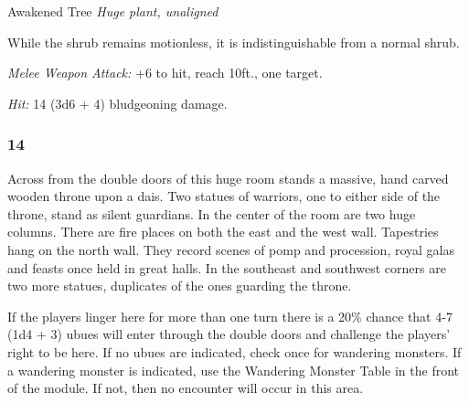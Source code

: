 \documentclass[palace_of_the_silver_princess]{subfiles}
\begin{document}
\begin{monsterbox}{Awakened Tree}
	\textit{Huge plant, unaligned}\\
	\hline
	\basics[
		armorclass = {13},
		hitpoints = {59 (7d12 + 14)},
		speed = {20~ft.}]
	\hline
	\stats[
		STR = \stat{19},
		DEX = \stat{6},
		CON = \stat{15},
		INT = \stat{10},
		WIS = \stat{10},
		CHA = \stat{7}]
	\hline
	\details[
        damagevulnerabilities = {fire},
        damageresistances = {bludgeoning, piercing},
		senses = {passive Perception 10},
		languages = {Common},
		challenge = {2 (450 XP)}]
	\hline
	\begin{monsteraction}
        While the shrub remains motionless, it is indistinguishable
        from a normal shrub.
	\end{monsteraction}

    \begin{monsteraction}[Slam]
		\textit{Melee Weapon Attack:} +6 to hit, reach 10ft., one
        target.

        \textit{Hit:} 14 (3d6 + 4) bludgeoning damage.
	\end{monsteraction}
\end{monsterbox}

\subsubsection{14}
\begin{quotebox}
    Across from the double doors of this huge room stands a massive,
    hand carved wooden throne upon a dais. Two statues of warriors, one
    to either side of the throne, stand as silent guardians. In the
    center of the room are two huge columns. There are fire places on
    both the east and the west wall. Tapestries hang on the north wall.
    They record scenes of pomp and procession, royal galas and feasts
    once held in great halls. In the southeast and southwest corners are
    two more statues, duplicates of the ones guarding the throne.
\end{quotebox}

If the players linger here for more than one turn there is a 20\%
chance that 4-7 (1d4 + 3) ubues will enter through the double doors and
challenge the players’ right to be here. If no ubues are indicated,
check once for wandering monsters. If a wandering monster is
indicated, use the Wandering Monster Table in the front of the module.
If not, then no encounter will occur in this area.
\end{document}
